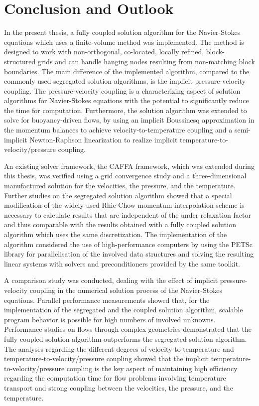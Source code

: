 \chapter{Conclusion and Outlook}
\label{sec:conclusion}

In the present thesis, a fully coupled solution algorithm for the Navier-Stokes equations which uses a finite-volume method was implemented. The method is designed to work with non-orthogonal, co-located, locally refined, block-structured grids and can handle hanging nodes resulting from non-matching block boundaries. The main difference of the implemented algorithm, compared to the commonly used segregated solution algorithms, is the implicit pressure-velocity coupling. The pressure-velocity coupling is a characterizing aspect of solution algorithms for Navier-Stokes equations with the potential to significantly reduce the time for computation. Furthermore, the solution algorithm was extended to solve for buoyancy-driven flows, by using an implicit Boussinesq approximation in the momentum balances to achieve velocity-to-temperature coupling and a semi-implicit Newton-Raphson linearization to realize implicit temperature-to-velocity/pressure coupling.

An existing solver framework, the CAFFA framework, which was extended during this thesis, was verified using a grid convergence study and a three-dimensional manufactured solution for the velocities, the pressure, and the temperature. Further studies on the segregated solution algorithm showed that a special modification of the widely used Rhie-Chow momentum interpolation scheme is necessary to calculate results that are independent of the under-relaxation factor and thus comparable with the results obtained with a fully coupled solution algorithm which uses the same discretization. The implementation of the algorithm considered the use of high-performance computers by using the PETSc library for parallelisation of the involved data structures and solving the resulting linear systems with solvers and preconditioners provided by the same toolkit.

A comparison study was conducted, dealing with the effect of implicit pressure-velocity coupling in the numerical solution process of the Navier-Stokes equations. Parallel performance measurements showed that, for the implementation of the segregated and the coupled solution algorithm, scalable program behavior is possible for high numbers of involved unknowns. Performance studies on flows through complex geometries demonstrated that the fully coupled solution algorithm outperforms the segregated solution algorithm. The analyses regarding the different degrees of velocity-to-temperature and temperature-to-velocity/pressure coupling showed that the implicit temperature-to-velocity/pressure coupling is the key aspect of maintaining high efficiency regarding the computation time for flow problems involving temperature transport and strong coupling between the velocities, the pressure, and the temperature.

